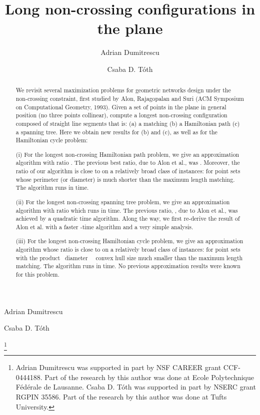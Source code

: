 \documentclass[proceedings]{stacs}
\begin{document}
\title{Long non-crossing configurations in the plane}


\author[lab1]{Adrian Dumitrescu}{Adrian Dumitrescu}
\address[lab1]{Department of Computer Science,
University of Wisconsin--Milwaukee,
WI 53201-0784, USA}

\author[lab2]{Csaba D. T\'oth}{Csaba D. T\'oth}
\address[lab2]{Department of Mathematics and Statistics,
University of Calgary, AB, Canada}

\thanks{Adrian Dumitrescu was supported in part by NSF CAREER grant CCF-0444188.
Part of the research by this author was done at
Ecole Polytechnique F\'ed\'erale de Lausanne.
Csaba D. T\'oth was supported in part by NSERC grant RGPIN 35586. Part
of the research by this author was done at Tufts University.}



\begin{abstract}
We revisit several maximization problems for geometric networks design
under the non-crossing constraint, first studied by Alon, Rajagopalan
and Suri (ACM Symposium on Computational Geometry, 1993).
Given a set of  points in the plane in general position (no three points
collinear), compute a longest non-crossing configuration composed of
straight line segments that is: (a) a matching  (b) a Hamiltonian path
(c) a spanning tree. Here we obtain new results for (b) and (c),
as well as for the Hamiltonian cycle problem:

(i)  For the longest non-crossing Hamiltonian path problem,
we give an approximation algorithm with ratio .
The previous best ratio, due to Alon et al., was .
Moreover, the ratio of our algorithm is close to  on a relatively broad
class of instances: for point sets whose perimeter (or diameter) is
much shorter than the maximum length matching.
The algorithm runs in  time.

(ii) For the longest non-crossing spanning tree problem, we give an
approximation algorithm with ratio  which runs in   time.
The previous ratio, , due to Alon et al., was achieved by a
quadratic time algorithm. Along the way, we first re-derive the result
of Alon et al. with a faster -time algorithm and a very
simple analysis.

(iii)  For the longest non-crossing Hamiltonian cycle problem,
we give an approximation algorithm whose ratio is close to  on a
relatively broad class of instances: for point sets with the product
~diameter~ ~convex hull size  much smaller
than the maximum length matching. The algorithm runs in
 time. No previous approximation results
were known for this problem.
\end{abstract}
\end{document}
